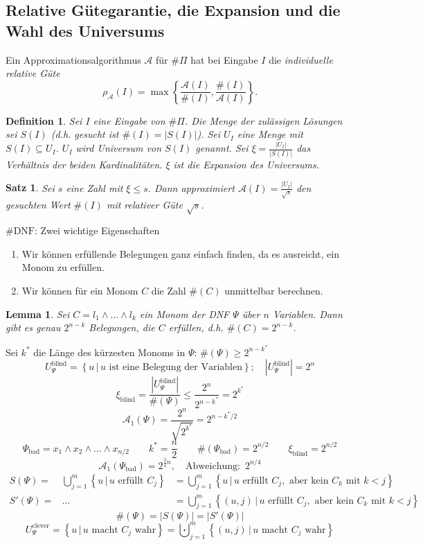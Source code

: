 \documentclass[a4paper]{scrartcl}
\newtheorem*{defn}{Definition}
\newtheorem*{satz}{Satz}
\newtheorem*{lemm}{Lemma}
\begin{document}
\subsection{Relative Gütegarantie, die Expansion und die Wahl des Universums}
Ein Approximationsalgorithmus $\mathcal{A}$ für $\#\Pi$ hat bei Eingabe $I$ die
\textit{individuelle relative Güte}
\[ \rho_\mathcal{A}(I) = \max\left\{ \frac{\mathcal{A}(I)}{\#(I)},
\frac{\#(I)}{\mathcal{A}(I)} \right\}. \]
\begin{defn}
	Sei $I$ eine Eingabe von $\#\Pi$. Die Menge der zulässigen Lösungen sei
	$S(I)$ (d.h. gesucht ist $\#(I) = |S(I)|$). Sei $U_I$ eine Menge mit
	$S(I) \subseteq U_I$. $U_I$ wird \textit{Universum} von $S(I)$ genannt.
	Sei $\xi = \frac{|U_I|}{|S(I)|}$ das Verhältnis der beiden
	Kardinalitäten. $\xi$ ist die \textit{Expansion} des Universums.
\end{defn}
\begin{satz}
	Sei $s$ eine Zahl mit $\xi \leq s$. Dann approximiert $\mathcal{A}(I) =
	\frac{|U_I|}{\sqrt{s}}$ den gesuchten Wert $\#(I)$ mit relativer Güte
	$\sqrt{s}$.
\end{satz}
$\#\text{DNF}$: Zwei wichtige Eigenschaften
\begin{enumerate}[(1)]
	\item Wir können erfüllende Belegungen ganz einfach finden, da es
		ausreicht, ein Monom zu erfüllen.
	\item Wir können für ein Monom $C$ die Zahl $\#(C)$ unmittelbar
		berechnen.
\end{enumerate}
\begin{lemm}
	Sei $C = l_1 \wedge \dots \wedge l_k$ ein Monom der DNF $\Psi$ über $n$
	Variablen.
	Dann gibt es genau $2^{n-k}$ Belegungen, die $C$ erfüllen, d.h. $\#(C) =
	2^{n-k}$.
\end{lemm}
Sei $k^*$ die Länge des kürzesten Monoms in $\Psi$: $\#(\Psi) \geq 2^{n-k^*}$
\[ U_\Psi^{\text{blind}} = \left\{ u\,|\,u \text{ ist eine Belegung der
Variablen} \right\}; \quad \left|U_\Psi^{\text{blind}}\right| = 2^n \]
\[ \xi_{\text{blind}} = \frac{\left|U_\Psi^{\text{blind}}\right|}{\#(\Psi)} \leq \frac{2^n}{2^{n-k^*}} = 2^{k^*} \]
\[ \mathcal{A}_1(\Psi) = \frac{2^n}{\sqrt{2^{k^*}}} = 2^{n-k^*/2} \]
\[ \Psi_{\text{bad}} = x_1 \wedge x_2 \wedge \dots \wedge x_{n/2} \quad \quad
k^* = \frac{n}{2} \quad \quad \#(\Psi_{\text{bad}}) = 2^{n/2} \quad \quad
\xi_{\text{blind}} = 2^{n/2} \]
\[ \mathcal{A}_1(\Psi_{\text{bad}}) = 2^{\frac{3}{4}n}, \quad \text{Abweichung: }\,2^{n/4} \]
\begin{eqnarray*}
	S(\Psi) = & \bigcup_{j=1}^{m} \left\{ u\,|\,u \text{ erfüllt } C_j
	\right\} & = \bigcup_{j=1}^{m} \left\{ u\,|\,u \text{ erfüllt } C_j,
	\text{ aber kein } C_k \text{ mit } k < j \right\} \\
	S'(\Psi) = & \dots & = \bigcup_{j=1}^{m} \left\{ (u, j)\,|\,u \text{ erfüllt } C_j,
	\text{ aber kein } C_k \text{ mit } k < j \right\}
\end{eqnarray*}
\[ \#(\Psi) = |S(\Psi)| = |S'(\Psi)| \]
\[ U_{\Psi}^{\text{clever}} = \left\{ u\,|\,u \text{ macht } C_j \text{ wahr} \right\} =
\bigcupdot_{j=1}^{m} \left\{ (u, j)\,|\,u \text{ macht } C_j \text{ wahr} \right\} \]
\end{document}
